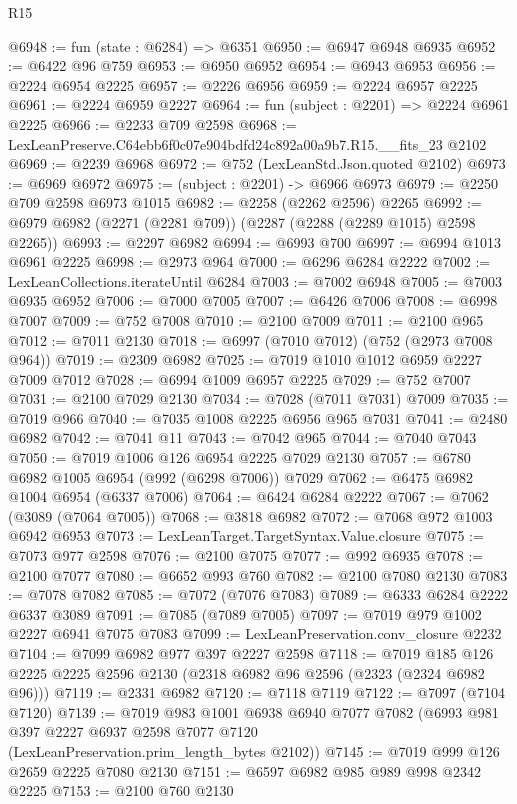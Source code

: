 \begin{lexlean}{R15}
\begin{coremodule}
@6948 := fun (state : @6284) => @6351
@6950 := @6947 @6948 @6935
@6952 := @6422 @96 @759
@6953 := @6950 @6952
@6954 := @6943 @6953
@6956 := @2224 @6954 @2225
@6957 := @2226 @6956
@6959 := @2224 @6957 @2225
@6961 := @2224 @6959 @2227
@6964 := fun (subject : @2201) => @2224 @6961 @2225
@6966 := @2233 @709 @2598
@6968 := LexLeanPreserve.C64ebb6f0c07e904bdfd24c892a00a9b7.R15.__fits_23 @2102
@6969 := @2239 @6968
@6972 := @752 (LexLeanStd.Json.quoted @2102)
@6973 := @6969 @6972
@6975 := (subject : @2201) -> @6966 @6973
@6979 := @2250 @709 @2598 @6973 @1015
@6982 := @2258 (@2262 @2596) @2265
@6992 := @6979 @6982 (@2271 (@2281 @709)) (@2287 (@2288 (@2289 @1015) @2598 @2265))
@6993 := @2297 @6982
@6994 := @6993 @700
@6997 := @6994 @1013 @6961 @2225
@6998 := @2973 @964
@7000 := @6296 @6284 @2222
@7002 := LexLeanCollections.iterateUntil @6284
@7003 := @7002 @6948
@7005 := @7003 @6935 @6952
@7006 := @7000 @7005
@7007 := @6426 @7006
@7008 := @6998 @7007
@7009 := @752 @7008
@7010 := @2100 @7009
@7011 := @2100 @965
@7012 := @7011 @2130
@7018 := @6997 (@7010 @7012) (@752 (@2973 @7008 @964))
@7019 := @2309 @6982
@7025 := @7019 @1010 @1012 @6959 @2227 @7009 @7012
@7028 := @6994 @1009 @6957 @2225
@7029 := @752 @7007
@7031 := @2100 @7029 @2130
@7034 := @7028 (@7011 @7031) @7009
@7035 := @7019 @966
@7040 := @7035 @1008 @2225 @6956 @965 @7031
@7041 := @2480 @6982
@7042 := @7041 @11
@7043 := @7042 @965
@7044 := @7040 @7043
@7050 := @7019 @1006 @126 @6954 @2225 @7029 @2130
@7057 := @6780 @6982 @1005 @6954 (@992 (@6298 @7006)) @7029
@7062 := @6475 @6982 @1004 @6954 (@6337 @7006)
@7064 := @6424 @6284 @2222
@7067 := @7062 (@3089 (@7064 @7005))
@7068 := @3818 @6982
@7072 := @7068 @972 @1003 @6942 @6953
@7073 := LexLeanTarget.TargetSyntax.Value.closure
@7075 := @7073 @977 @2598
@7076 := @2100 @7075
@7077 := @992 @6935
@7078 := @2100 @7077
@7080 := @6652 @993 @760
@7082 := @2100 @7080 @2130
@7083 := @7078 @7082
@7085 := @7072 (@7076 @7083)
@7089 := @6333 @6284 @2222 @6337 @3089
@7091 := @7085 (@7089 @7005)
@7097 := @7019 @979 @1002 @2227 @6941 @7075 @7083
@7099 := LexLeanPreservation.conv_closure @2232
@7104 := @7099 @6982 @977 @397 @2227 @2598
@7118 := @7019 @185 @126 @2225 @2225 @2596 @2130 (@2318 @6982 @96 @2596 (@2323 (@2324 @6982 @96)))
@7119 := @2331 @6982
@7120 := @7118 @7119
@7122 := @7097 (@7104 @7120)
@7139 := @7019
    @983
    @1001
    @6938
    @6940
    @7077
    @7082
    (@6993 @981 @397 @2227 @6937 @2598 @7077 @7120 (LexLeanPreservation.prim_length_bytes @2102))
@7145 := @7019 @999 @126 @2659 @2225 @7080 @2130
@7151 := @6597 @6982 @985 @989 @998 @2342 @2225
@7153 := @2100 @760 @2130

\end{coremodule}
\end{lexlean}
